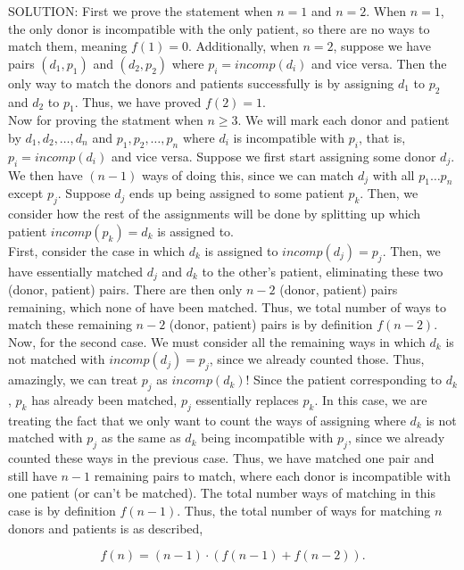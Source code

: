 \documentclass[11pt]{article}
\begin{document}
\begin{enumerate}
\begin{enumerate}
 SOLUTION: First we prove the statement when $n=1$ and $n=2$. When $n=1$, the only donor is incompatible with the only patient, so there are no ways to match them, meaning $f(1) = 0$. Additionally, when $n=2$, suppose we have pairs $(d_1, p_1)$ and $(d_2, p_2)$ where $p_i = incomp(d_i)$ and vice versa. Then the only way to match the donors and patients successfully is by assigning $d_1$ to $p_2$ and $d_2$ to $p_1$. Thus, we have proved $f(2) = 1$. \\
 
 Now for proving the statment when $n \geq 3$. We will mark each donor and patient by $d_1, d_2, \dots, d_n$ and $p_1, p_2, \dots, p_n$ where $d_i$ is incompatible with $p_i$, that is, $p_i = incomp(d_i)$ and vice versa. Suppose we first start assigning some donor $d_j$. We then have $(n-1)$ ways of doing this, since we can match $d_j$ with all $p_1 \dots p_n$ except $p_j$. Suppose $d_j$ ends up being assigned to some patient $p_k$. Then, we consider how the rest of the assignments will be done by splitting up which patient $incomp(p_k) = d_k$ is assigned to. \\
 
 First, consider the case in which $d_k$ is assigned to $incomp(d_j) = p_j$. Then, we have essentially matched $d_j$ and $d_k$ to the other's patient, eliminating these two (donor, patient) pairs. There are then only $n-2$ (donor, patient) pairs remaining, which none of have been matched. Thus, we total number of ways to match these remaining $n-2$ (donor, patient) pairs is by definition $f(n-2)$. \\
 
 Now, for the second case. We must consider all the remaining ways in which $d_k$ is not matched with $incomp(d_j) = p_j$, since we already counted those. Thus, amazingly, we can treat $p_j$ as $incomp(d_k)$! Since the patient corresponding to $d_k$, $p_k$ has already been matched, $p_j$ essentially replaces $p_k$. In this case, we are treating the fact that we only want to count the ways of assigning where $d_k$ is not matched with $p_j$ as the same as $d_k$ being incompatible with $p_j$, since we already counted these ways in the previous case. Thus, we have matched one pair and still have $n-1$ remaining pairs to match, where each donor is incompatible with one patient (or can't be matched). The total number ways of matching in this case is by definition $f(n-1)$. Thus, the total number of ways for matching $n$ donors and patients is as described, 
 
  $$ f(n) = (n-1)\cdot (f(n-1)+f(n-2)).$$
 


\end{enumerate}
\end{enumerate}
\end{document}
